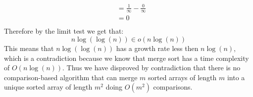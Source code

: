 \documentclass[12pt]{article}
\begin{document}
\begin{adjustwidth}{0em}{0pt}
\begin{align*}
\begin{aligned}
       &= \frac{1}{\infty} - \frac{0}{\infty}  \\
       &= 0 \\
    \end{aligned}
\end{align*}
Therefore by the limit test we get that: 
\[ n \log(\log(n)) \in o(n \log(n)) \]
This means that $n \log(\log(n))$ has a growth rate less then $n \log(n)$, which is a contradiction because we know that merge sort has a time complexity of $O(n \log(n))$.
Thus we have disproved by contradiction that there is no comparison-based algorithm that can merge $m$ sorted arrays of length $m$ into a unique sorted
array of length $m^2$ doing $O(m^2)$ comparisons. 
\end{adjustwidth} 
\end{document}
